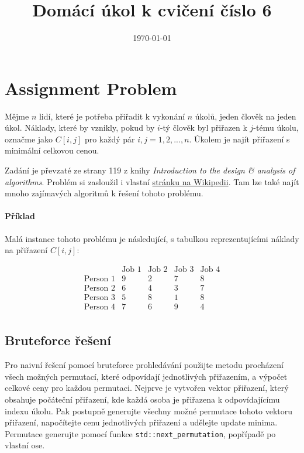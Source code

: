 \documentclass{article}
\title{Domácí úkol k cvičení číslo 6}
\date{\today}
\begin{document}
		\maketitle
	
	\section{Assignment Problem}
	
	Mějme $n$ lidí, které je potřeba přiřadit k vykonání $n$ úkolů, jeden člověk na jeden úkol. Náklady, které by vznikly, pokud by $i$-tý člověk byl přiřazen k $j$-tému úkolu, označme jako $C[i, j]$ pro každý pár $i, j = 1, 2, . . . , n$. Úkolem je najít přiřazení s minimální celkovou cenou.
	
	Zadání je převzaté ze strany 119 z  knihy \textit{Introduction to the design \& analysis of algorithms}.
	Problém si zasloužil i vlastní \href{https://en.wikipedia.org/wiki/Assignment_problem}{stránku na Wikipedii}.
	Tam lze také najít mnoho zajímavých algoritmů k řešení tohoto problému.
	
	\paragraph{Příklad}
	
	Malá instance tohoto problému je následující, s tabulkou reprezentujícími náklady na přiřazení $C[i, j]$:
	
	\[
	\begin{array}{c|cccc}
		& \text{Job 1} & \text{Job 2} & \text{Job 3} & \text{Job 4} \\
		\hline
		\text{Person 1} & 9 & 2 & 7 & 8 \\
		\text{Person 2} & 6 & 4 & 3 & 7 \\
		\text{Person 3} & 5 & 8 & 1 & 8 \\
		\text{Person 4} & 7 & 6 & 9 & 4 \\
	\end{array}
	\]
	
	\subsection{Bruteforce řešení}
	
	Pro naivní řešení pomocí bruteforce prohledávání použijte metodu procházení všech možných permutací, které odpovídají jednotlivých přiřazením, a výpočet celkové ceny pro každou permutaci.
	Nejprve je vytvořen vektor přiřazení, který obsahuje počáteční přiřazení, kde každá osoba je přiřazena k odpovídajícímu indexu úkolu.
	Pak postupně generujte všechny možné permutace tohoto vektoru přiřazení, napočítejte cenu jednotlivých přiřazení a udělejte update minima.
	Permutace generujte pomocí funkce \texttt{std::next\_permutation}, popřípadě po vlastní ose.
	
\end{document}
